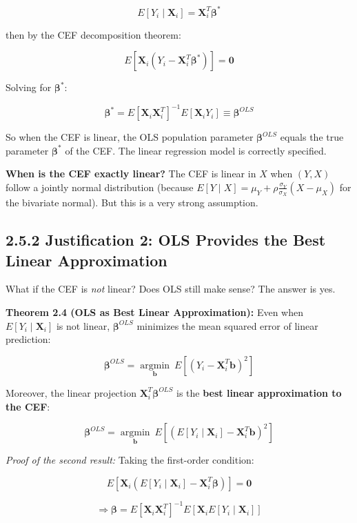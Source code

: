 \[
E[Y_i \mid \mathbf{X}_i] = \mathbf{X}_i^T \boldsymbol{\beta}^*
\]

then by the CEF decomposition theorem:

\[
E\left[\mathbf{X}_i(Y_i - \mathbf{X}_i^T \boldsymbol{\beta}^*)\right] = \mathbf{0}
\]

Solving for $\boldsymbol{\beta}^*$:

\[
\boldsymbol{\beta}^* = E[\mathbf{X}_i \mathbf{X}_i^T]^{-1} E[\mathbf{X}_i Y_i] \equiv \boldsymbol{\beta}^{OLS}
\]

So when the CEF is linear, the OLS population parameter $\boldsymbol{\beta}^{OLS}$ equals the true parameter $\boldsymbol{\beta}^*$ of the CEF. The linear regression model is correctly specified.

\textbf{When is the CEF exactly linear?} The CEF is linear in $X$ when $(Y, X)$ follow a jointly normal distribution (because $E[Y \mid X] = \mu_Y + \rho \frac{\sigma_Y}{\sigma_X}(X - \mu_X)$ for the bivariate normal). But this is a very strong assumption.

\subsection{2.5.2 Justification 2: OLS Provides the Best Linear Approximation}

What if the CEF is \textit{not} linear? Does OLS still make sense? The answer is yes.

\textbf{Theorem 2.4 (OLS as Best Linear Approximation):} Even when $E[Y_i \mid \mathbf{X}_i]$ is not linear, $\boldsymbol{\beta}^{OLS}$ minimizes the mean squared error of linear prediction:

\[
\boldsymbol{\beta}^{OLS} = \underset{\mathbf{b}}{\operatorname{argmin}} \ E\!\left[(Y_i - \mathbf{X}_i^T \mathbf{b})^2\right]
\]

Moreover, the linear projection $\mathbf{X}_i^T \boldsymbol{\beta}^{OLS}$ is the \textbf{best linear approximation to the CEF}:

\[
\boldsymbol{\beta}^{OLS} = \underset{\mathbf{b}}{\operatorname{argmin}} \ E\!\left[(E[Y_i \mid \mathbf{X}_i] - \mathbf{X}_i^T \mathbf{b})^2\right]
\]

\textit{Proof of the second result:} Taking the first-order condition:

\[
E\!\left[\mathbf{X}_i(E[Y_i \mid \mathbf{X}_i] - \mathbf{X}_i^T \boldsymbol{\beta})\right] = \mathbf{0}
\]

\[
\Rightarrow \boldsymbol{\beta} = E[\mathbf{X}_i \mathbf{X}_i^T]^{-1} E[\mathbf{X}_i E[Y_i \mid \mathbf{X}_i]]
\]

